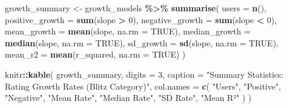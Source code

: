 \documentclass[
]{article}
\newenvironment{Shaded}{\begin{snugshade}}{\end{snugshade}}
\newcommand{\AttributeTok}[1]{\textcolor[rgb]{0.13,0.29,0.53}{#1}}
\newcommand{\ConstantTok}[1]{\textcolor[rgb]{0.56,0.35,0.01}{#1}}
\newcommand{\DecValTok}[1]{\textcolor[rgb]{0.00,0.00,0.81}{#1}}
\newcommand{\FunctionTok}[1]{\textcolor[rgb]{0.13,0.29,0.53}{\textbf{#1}}}
\newcommand{\NormalTok}[1]{#1}
\newcommand{\OtherTok}[1]{\textcolor[rgb]{0.56,0.35,0.01}{#1}}
\newcommand{\SpecialCharTok}[1]{\textcolor[rgb]{0.81,0.36,0.00}{\textbf{#1}}}
\newcommand{\StringTok}[1]{\textcolor[rgb]{0.31,0.60,0.02}{#1}}
\begin{document}
\begin{Shaded}
\begin{Highlighting}[]
\NormalTok{growth\_summary }\OtherTok{\textless{}{-}}\NormalTok{ growth\_models }\SpecialCharTok{\%\textgreater{}\%}
    \FunctionTok{summarise}\NormalTok{(}
        \AttributeTok{users =} \FunctionTok{n}\NormalTok{(),}
        \AttributeTok{positive\_growth =} \FunctionTok{sum}\NormalTok{(slope }\SpecialCharTok{\textgreater{}} \DecValTok{0}\NormalTok{),}
        \AttributeTok{negative\_growth =} \FunctionTok{sum}\NormalTok{(slope }\SpecialCharTok{\textless{}} \DecValTok{0}\NormalTok{),}
        \AttributeTok{mean\_growth =} \FunctionTok{mean}\NormalTok{(slope, }\AttributeTok{na.rm =} \ConstantTok{TRUE}\NormalTok{),}
        \AttributeTok{median\_growth =} \FunctionTok{median}\NormalTok{(slope, }\AttributeTok{na.rm =} \ConstantTok{TRUE}\NormalTok{),}
        \AttributeTok{sd\_growth =} \FunctionTok{sd}\NormalTok{(slope, }\AttributeTok{na.rm =} \ConstantTok{TRUE}\NormalTok{),}
        \AttributeTok{mean\_r2 =} \FunctionTok{mean}\NormalTok{(r\_squared, }\AttributeTok{na.rm =} \ConstantTok{TRUE}\NormalTok{)}
\NormalTok{    )}

\NormalTok{knitr}\SpecialCharTok{::}\FunctionTok{kable}\NormalTok{(}
\NormalTok{    growth\_summary,}
    \AttributeTok{digits =} \DecValTok{3}\NormalTok{,}
    \AttributeTok{caption =} \StringTok{"Summary Statistics: Rating Growth Rates (Blitz Category)"}\NormalTok{,}
    \AttributeTok{col.names =} \FunctionTok{c}\NormalTok{(}
        \StringTok{"Users"}\NormalTok{, }\StringTok{"Positive"}\NormalTok{, }\StringTok{"Negative"}\NormalTok{, }\StringTok{"Mean Rate"}\NormalTok{, }\StringTok{"Median Rate"}\NormalTok{,}
        \StringTok{"SD Rate"}\NormalTok{, }\StringTok{"Mean R²"}
\NormalTok{    )}
\NormalTok{)}
\end{Highlighting}
\end{Shaded}
\end{document}
